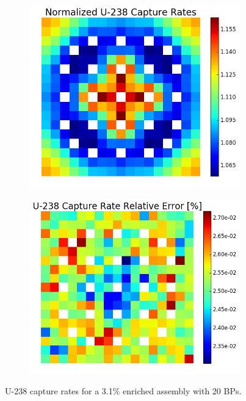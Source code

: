 \begin{figure}[h!]
\centering
\begin{subfigure}{0.44\textwidth}
  \centering
  \includegraphics[width=\linewidth]{figures/benchmarks/capture-rates/capt-mean-assm-31-20BPs}
  \caption{}
  \label{fig:chap7-capt-rate-mean-3.1-20BAs-assm}
\end{subfigure}%
\begin{subfigure}{0.44\textwidth}
  \centering
  \includegraphics[width=\linewidth]{figures/benchmarks/capture-rates/capt-rel-err-assm-31-20BPs}
  \caption{}
  \label{fig:chap7-capt-rate-rel-err-3.1-20BAs-assm}
\end{subfigure}%
\caption[U-238 capture rates for a 3.1\% enriched assembly with 20 BPs]{U-238 capture rates for a 3.1\% enriched assembly with 20 \ac{BP}s.}
\label{fig:chap7-capt-rates-3.1-assm-20BAs}
\end{figure}

